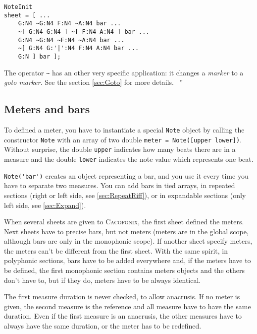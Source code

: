 \documentclass{article}
\newcommand{\cacofonix}{\textsc{Cacofonix}\xspace}
\newcommand{\note}{\lstinline!Note!\xspace}
\newenvironment{meenv}{ \par \noindent \makebox[6em][r]{ \textcolor{mecolor}{Me}: `` --~}}{~''}
\newenvironment{myselfenv}{ \par \noindent \makebox[6em][r]{ \textcolor{myselfcolor}{Myself}: `` --~}}{~''}
\newcommand{ \me }[1]{%
\begin{meenv}%
	#1%
\end{meenv} }
\newcommand{ \myself }[1]{%
\begin{myselfenv}%
	#1%
\end{myselfenv} }
\begin{document}
\begin{lstlisting}
NoteInit
sheet = [ ...
	G:N4 ~G:N4 F:N4 ~A:N4 bar ...
	~[ G:N4 G:N4 ] ~[ F:N4 A:N4 ] bar ...
	G:N4 ~G:N4 ~F:N4 ~A:N4 bar ...
	~[ G:N4 G:'|':N4 F:N4 A:N4 bar ...
	G:N ] bar ];
\end{lstlisting}

\begin{meenv}%
The operator \lstinline!~! has an other very specific application: it changes a \emph{marker} to a \emph{goto marker}. See the section \ref{sec:Goto} for more details.%
\end{meenv}

\subsection{Meters and bars}
\label{sec:MetersAndBars}

To defined a meter, you have to instantiate a special \note object by calling the constructor \note with an array of two double \lstinline!meter = Note([upper lower])!. Without surprise, the double \lstinline!upper! indicates how many beats there are in a measure and the double \lstinline!lower! indicates the note value which represents one beat.

\lstinline!Note('bar')! creates an object representing a bar, and you use it every time you have to separate two measures. You can add bars in tied arrays, in repeated sections (right or left side, see \ref{sec:RepeatRiff}), or in expandable sections (only left side, see \ref{sec:Expand}).

When several sheets are given to \cacofonix, the first sheet defined the meters. Next sheets have to precise bars, but not meters (meters are in the global scope, although bars are only in the monophonic scope). If another sheet specify meters, the meters can't be different from the first sheet. With the same spirit, in polyphonic sections, bars have to be added everywhere and, if the meters have to be defined, the first monophonic section contains meters objects and the others don't have to, but if they do, meters have to be always identical.

The first measure duration is never checked, to allow anacrusis. If no meter is given, the second measure is the reference and all measure have to have the same duration. Even if the first measure is an anacrusis, the other measures have to always have the same duration, or the meter has to be redefined.
\end{document}
